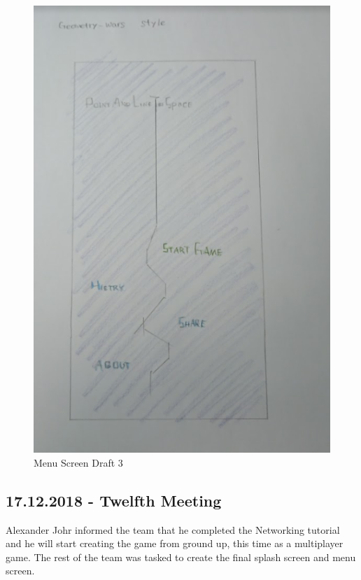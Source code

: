 \begin{figure}[htbp]
	\centering
		\includegraphics[width=1.00\textwidth]{img/Menu3.png}
	\caption[Menu Screen Draft 3]{Menu Screen Draft 3}
	\label{fig:Menu3}
\end{figure}


\subsection{17.12.2018 - Twelfth Meeting}
Alexander Johr informed the team that he completed the Networking tutorial and he will start creating the game from ground up, this time as a multiplayer game. The rest of the team was tasked to create the final splash screen and menu screen.



